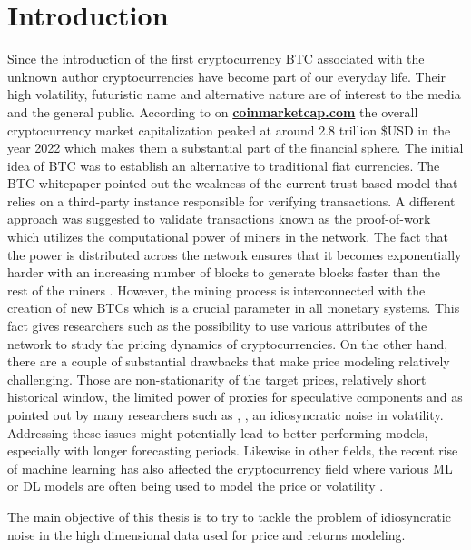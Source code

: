 \chapter{Introduction}
\label{chap:one}

Since the introduction of the first cryptocurrency \ac{BTC}
associated with the unknown author \cite{Nakamoto2008} cryptocurrencies
have become part of our everyday life. Their high volatility, futuristic name 
and alternative nature are of interest to the media and the general public.
According to on \textbf{\href{https://coinmarketcap.com/charts/}{coinmarketcap.com}}
the overall cryptocurrency market capitalization peaked at around 2.8 trillion \$USD in the year 2022
which makes them a substantial part of the financial sphere.
The initial idea of \ac{BTC} was to establish an alternative to traditional fiat currencies. 
The \ac{BTC} whitepaper
pointed out the weakness of the current trust-based model that relies on a third-party instance responsible
for verifying transactions.
A different approach was suggested to validate transactions known as the proof-of-work which
utilizes the computational power of miners in the network. The fact that the power is 
distributed across the network ensures that it becomes exponentially harder with an increasing number of blocks
to generate blocks faster than the rest of the miners \cite[pg.~6]{Nakamoto2008}. 
However, the mining process is interconnected with the creation of new \ac{BTC}s which is a crucial parameter
in all monetary systems. This fact gives researchers such as \cite{Kukacka2023} 
the possibility to use various attributes of the network to study the pricing dynamics of cryptocurrencies. 
On the other hand, there are a couple of substantial drawbacks that make price modeling relatively challenging.
Those are non-stationarity of the target prices, relatively short historical window, the limited power of
proxies for speculative components and as pointed out by many researchers 
such as \cite{Bouri2022}, \cite{Dimpfl2021}, \cite{Watorek2023} an idiosyncratic noise in volatility.
Addressing these issues might potentially lead to better-performing models, especially
with longer forecasting periods. Likewise in other fields, the recent rise of machine learning 
has also affected the cryptocurrency field where various \ac{ML} or \ac{DL} models are often being used 
to model the price \cite{Khedr2021} or volatility \cite{Kristjanpoller2018}. 


The main objective of this thesis is to try to tackle the problem of idiosyncratic noise in
the high dimensional data used for price and returns modeling.


